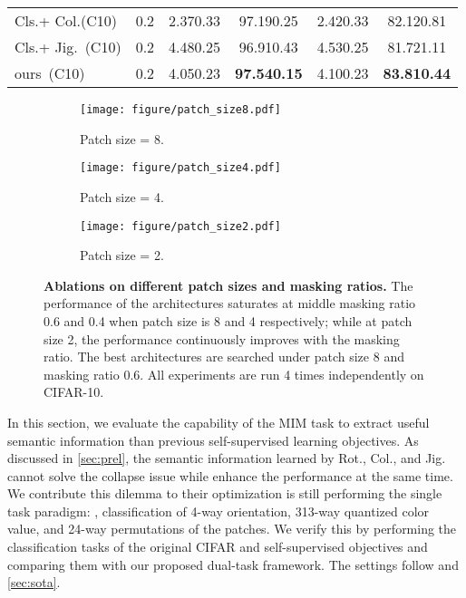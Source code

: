 \documentclass[10pt,twocolumn,letterpaper]{article}
\begin{document}
\begin{table*}
{\begin{tabular}{lccccc}
    Cls.+ Col.(C10)    & 0.2           & 2.370.33 & 97.190.25  & 2.420.33 & 82.120.81    \\
    Cls.+ Jig.~(C10)    &  0.2          & 4.480.25 & 96.910.43  & 4.530.25 & 81.721.11    \\
    ours~(C10)              & 0.2           & 4.050.23 & \textbf{97.540.15} & 4.100.23 & \textbf{83.810.44}  \\
    \bottomrule
\end{tabular}
}
\label{tab:unnas_with_multi}
\vspace{-6pt}
\end{table*} \begin{figure*}
  \centering
  \begin{subfigure}{0.28\linewidth}
    \texttt{[image: figure/patch\_size8.pdf]}
    \caption{Patch size = 8.}
    \label{fig:ps8}
  \end{subfigure}
\hspace{+8pt}
  \begin{subfigure}{0.28\linewidth}
    \texttt{[image: figure/patch\_size4.pdf]}
    \caption{Patch size = 4.}
    \label{fig:ps4}
  \end{subfigure}
\hspace{+8pt}
  \begin{subfigure}{0.28\linewidth}
    \texttt{[image: figure/patch\_size2.pdf]}
    \caption{Patch size = 2.}
    \label{fig:ps2}
  \end{subfigure}
  \vspace{-6pt}
  \caption{\textbf{Ablations on different patch sizes and masking ratios.}
  The performance of the architectures saturates at middle masking ratio 0.6 and 0.4 when patch size is 8 and 4 respectively; 
  while at patch size 2, the performance continuously improves with the masking ratio.
  The best architectures are searched under patch size 8 and masking ratio 0.6.
  All experiments are run 4 times independently on CIFAR-10.}
  \label{fig:c10_patch_size}
  \vspace{-6pt}
\end{figure*} In this section, we evaluate the capability of the MIM task to extract useful semantic information than previous self-supervised learning objectives.
As discussed in \cref{sec:prel}, the semantic information learned by Rot., Col., and Jig. cannot solve the collapse issue while enhance the performance at the same time.
We contribute this dilemma to their optimization is still performing the single task paradigm: \ie, classification of 4-way orientation, 313-way quantized color value, and 24-way permutations of the patches.
We verify this by performing the classification tasks of the original CIFAR and self-supervised objectives and comparing them with our proposed dual-task framework.
The settings follow \cite{liu_2020_unnas} and \cref{sec:sota}.
\end{document}
